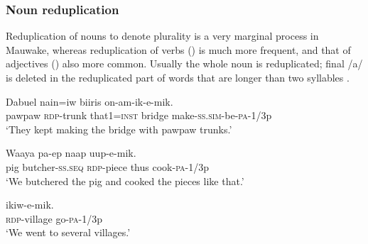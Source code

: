 
\subsubsection{Noun reduplication}\label{sec:3:z:y:x}
{}
Reduplication of nouns to denote plurality is a very marginal process in Mauwake, whereas reduplication of verbs () is much more frequent, and that of adjectives () also more common. Usually the whole noun is reduplicated; final /a/ is deleted in the reduplicated part of words that are longer than two syllables . 

\ea%
\label{ex:3:x68}
\gll Dabuel  nain=iw biiris on-am-ik-e-mik. \\
pawpaw \textsc{rdp}-trunk that1=\textsc{inst} bridge make-\textsc{ss}.\textsc{sim}-be-\textsc{pa}-1/3p\\
\glt`They kept making the bridge with pawpaw trunks.'
\z

\ea%
\label{ex:3:x69}
\gll Waaya pa-ep  naap uup-e-mik. \\
pig butcher-\textsc{ss}.\textsc{seq} \textsc{rdp}-piece thus cook-\textsc{pa}-1/3p\\
\glt`We butchered the pig and cooked the pieces like that.'
\z

\ea%
\label{ex:3:x426}
\gll {} ikiw-e-mik. \\
\textsc{rdp}-village go-\textsc{pa}-1/3p\\
\glt`We went to several villages.'
\z


